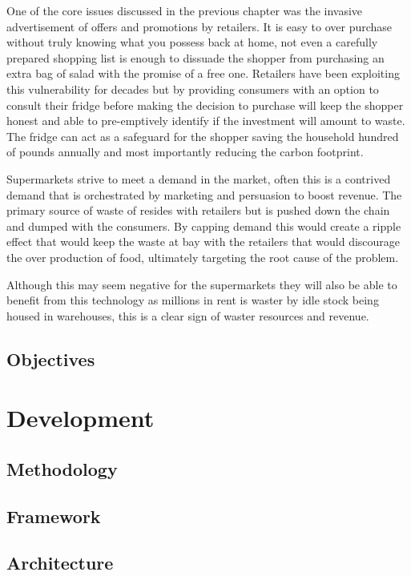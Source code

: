 \documentclass[a4paper, 11pt]{article}
\begin{document}
One of the core issues discussed in the previous chapter was the invasive advertisement of offers and promotions by retailers. It is easy to over purchase without truly knowing what you possess back at home, not even a carefully prepared shopping list is enough to dissuade the shopper from purchasing an extra bag of salad with the promise of a free one. Retailers have been exploiting this vulnerability for decades but by providing consumers with an option to consult their fridge before making the decision to purchase will keep the shopper honest and able to pre-emptively identify if the investment will amount to waste. The fridge can act as a safeguard for the shopper saving the household hundred of pounds annually and most importantly reducing the carbon footprint. 

Supermarkets strive to meet a demand in the market, often this is a contrived demand that is orchestrated by marketing and persuasion to boost revenue. The primary source of waste of resides with retailers but is pushed down the chain and dumped with the consumers. By capping demand this would create a ripple effect that would keep the waste at bay with the retailers that would discourage the over production of food, ultimately targeting the root cause of the problem.

Although this may seem negative for the supermarkets they will also be able to benefit from this technology as millions in rent is waster by idle stock being housed in warehouses, this is a clear sign of waster resources and revenue. 
\subsection{Objectives}
\clearpage


\section{Development}
\subsection{Methodology}
\subsection{Framework}
\subsection{Architecture}
\end{document}
